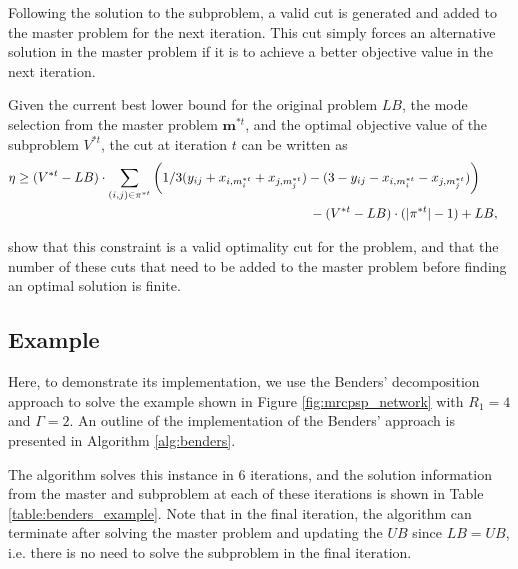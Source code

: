 \documentclass[a4paper,abstracton]{scrartcl}
\begin{document}
Following the solution to the subproblem, a valid cut is generated and added to the master problem for the next iteration. This cut simply forces an alternative solution in the master problem if it is to achieve a better objective value in the next iteration. 

Given the current best lower bound for the original problem $LB$, the mode selection from the master problem $\bm{m}^{*t}$, and the optimal objective value of the subproblem $V^{*t}$, the cut at iteration $t$ can be written as
\begin{align}
	& \eta \geq (V^{*t} - LB)\cdot\sum_{(i,j)\in \pi^{*t}}\bigg(1/3 (y_{ij} + x_{i,m_i^{*t}} + x_{j,m_j^{*t}}) - (3 - y_{ij} - x_{i,m_i^{*t}} - x_{j,m_j^{*t}})\bigg) & \nonumber \\
	& \hspace{8.1cm} - (V^{*t} - LB)\cdot(|\pi^{*t}|-1) + LB,\label{eqn:benders_cut}
\end{align}

\cite{balouka2021robust} show that this constraint is a valid optimality cut for the problem, and that the number of these cuts that need to be added to the master problem before finding an optimal solution is finite.


\subsection{Example}

Here, to demonstrate its implementation, we use the Benders' decomposition approach to solve the example shown in Figure \ref{fig:mrcpsp_network} with $R_1=4$ and $\Gamma=2$. An outline of the implementation of the Benders' approach is presented in Algorithm \ref{alg:benders}. 

The algorithm solves this instance in 6 iterations, and the solution information from the master and subproblem at each of these iterations is shown in Table \ref{table:benders_example}. Note that in the final iteration, the algorithm can terminate after solving the master problem and updating the $UB$ since $LB=UB$, i.e. there is no need to solve the subproblem in the final iteration.
\end{document}
